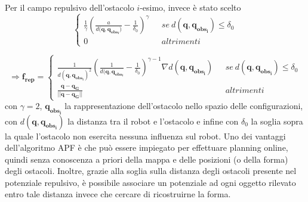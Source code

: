 Per il campo repulsivo dell'ostacolo $i$-esimo, invece è stato scelto
\begin{equation}
  \begin{cases}
    \frac{1}{\gamma} (\frac{a}{d( \boldsymbol{q},  \boldsymbol{q_{obs_i})}} - \frac{1}{\delta_0})^\gamma \: \: \:  & se \: d( \boldsymbol{q},  \boldsymbol{q_{obs_i}}) \leq \delta_0 \\
    0  \: \: \:  & altrimenti
  \end{cases} 
\end{equation}
  

\begin{equation*}
\Rightarrow \boldsymbol{f_{rep}} = 
\begin{cases}

  \frac{1}{d( \boldsymbol{q},  \boldsymbol{q_{obs_i}} )^2} ( \frac{1}{d( \boldsymbol{q},  \boldsymbol{q_{obs_i}}} - \frac{1}{\delta_0})^{\gamma -1} \nabla d( \boldsymbol{q},  \boldsymbol{q_{obs_i}} )   \: \: \: & se \: d( \boldsymbol{q},  \boldsymbol{q_{obs_i}} ) \leq \delta_0 
   \\
\frac{ \boldsymbol{q} - \boldsymbol{q_G}}{|| \boldsymbol{q} - \boldsymbol{q_G}||} \: \: \:  & altrimenti
  \end{cases} 
\end{equation*}
con $ \gamma = 2$, $ \boldsymbol{q_{obs_i}} $ la rappresentazione dell'ostacolo nello spazio delle configurazioni, con $ d( \boldsymbol{q},  \boldsymbol{q_{obs_i}}) $ la
distanza tra il robot e l'ostacolo e infine con $ \delta_0 $ la soglia sopra la quale l'ostacolo non esercita nessuna influenza sul robot.
Uno dei vantaggi dell'algoritmo APF è che può essere impiegato per effettuare planning online, quindi senza conoscenza a priori della mappa e delle posizioni (o della 
forma) degli ostacoli. Inoltre, grazie alla soglia sulla distanza degli ostacoli presente nel potenziale repulsivo, è possibile associare un potenziale ad ogni oggetto rilevato entro tale distanza invece che cercare di ricostruirne la forma.

